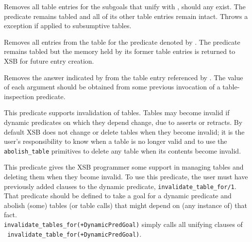 \begin{description}
\begin{description}


%
Removes all table entries for the subgoals that unify with
, should any exist. The predicate remains tabled and
all of its other table entries remain intact. Throws a
 exception if applied to subsumptive tables.


%
Removes all entries from the table for the predicate denoted by
.  The predicate remains tabled but the memory held by
its former table entries is returned to XSB for future entry creation.


%
Removes the answer indicated by  from the table
entry referenced by .  The value of each
argument should be obtained from some previous invocation of a
table-inspection predicate.



This predicate supports invalidation of tables.  Tables may become
invalid if dynamic predicates on which they depend change, due to
asserts or retracts.  By default XSB does not change or delete tables
when they become invalid; it is the user's responsibility to know when
a table is no longer valid and to use the {\tt abolish\_table}
primitives to delete any table when its contents become invalid.

This predicate gives the XSB programmer some support in managing
tables and deleting them when they bcome invalid.  To use this
predicate, the user must have previously added clauses to the dynamic
predicate, {\tt invalidate\_table\_for/1}.  That predicate should be
defined to take a goal for a dynamic predicate and abolish (some)
tables (or table calls) that might depend on (any instance of) that
fact.  \\ {\tt invalidate\_tables\_for(+DynamicPredGoal)} simply calls
all unifying clauses of \\ {\tt
invalidate\_table\_for(+DynamicPredGoal)}.


\end{description}
\end{description}
